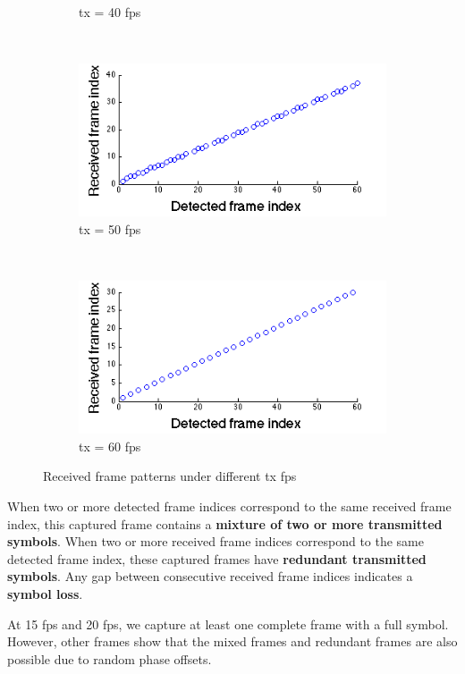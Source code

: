 \begin{figure}[!htb]
\begin{subfigure}[h]{0.25\textwidth}
      \caption{tx = 40 fps} \label{fig:tx_40fps}
   \end{subfigure}%
  \\
   \begin{subfigure}[h]{0.25\textwidth}
      \includegraphics[width=\textwidth]{fig/tx_50.png}
      \caption{tx = 50 fps} \label{fig:tx_50fps}
   \end{subfigure}%
   ~
   \begin{subfigure}[h]{0.25\textwidth}
      \includegraphics[width=\textwidth]{fig/tx_60.png}
      \caption{tx = 60 fps} \label{fig:tx_60fps}
   \end{subfigure}%
   \caption{Received frame patterns under different tx fps}
   \label{fig:diff_tx}
\end{figure}

When two or more detected frame indices correspond to the same received frame index, this captured frame contains a \textbf{mixture of two or more transmitted symbols}. When two or more received frame indices correspond to the same detected frame index, these captured frames have \textbf{redundant transmitted symbols}. Any gap between consecutive received frame indices indicates a \textbf{symbol loss}.

At 15 fps and 20 fps, we capture at least one complete frame with a full symbol. However, other frames show that the mixed frames and redundant frames are also possible due to random phase offsets.

